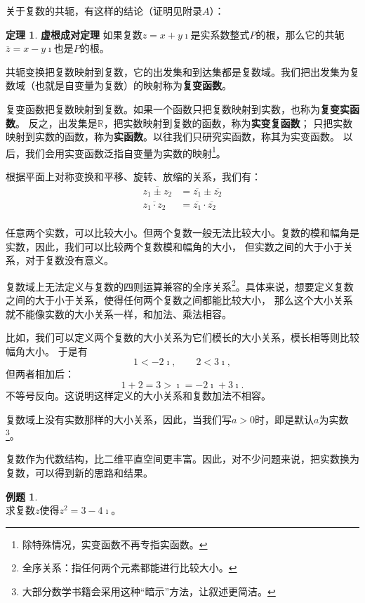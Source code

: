 \documentclass[12pt,UTF8]{ctexbook}
\theoremstyle{definition}
\newtheorem{tm}{定理}[section]
\newtheorem{et}{例题}[section]
\theoremstyle{plain}
\begin{document}
关于复数的共轭，有这样的结论（证明见附录$A$）：
\begin{tm}{\textbf{虚根成对定理}}
    如果复数$z=x+y\imath$是实系数整式$P$的根，那么它的共轭$\overline{z}=x-y\imath$也是$P$的根。
\end{tm}

共轭变换把复数映射到复数，它的出发集和到达集都是复数域。我们把出发集为复数域（也就是自变量为复数）的映射称为\textbf{复变函数}。

复变函数把复数映射到复数。如果一个函数只把复数映射到实数，也称为\textbf{复变实函数}。
反之，出发集是$\mathbb{R}$，把实数映射到复数的函数，称为\textbf{实变复函数}；
只把实数映射到实数的函数，称为\textbf{实函数}。以往我们只研究实函数，称其为实变函数。
以后，我们会用实变函数泛指自变量为实数的映射\footnote{除特殊情况，实变函数不再专指实函数。}。

根据平面上对称变换和平移、旋转、放缩的关系，我们有：
\begin{align*}
    \overline{z_1 \pm z_2} &= \overline{z_1} \pm \overline{z_2} \\
    \overline{z_1 \cdot z_2} &= \overline{z_1} \cdot \overline{z_2} \\
\end{align*}

任意两个实数，可以比较大小。但两个复数一般无法比较大小。复数的模和幅角是实数，因此，我们可以比较两个复数模和幅角的大小，
但实数之间的大于小于关系，对于复数没有意义。

复数域上无法定义与复数的四则运算兼容的全序关系\footnote{全序关系：指任何两个元素都能进行比较大小。}。具体来说，想要定义复数之间的大于小于关系，使得任何两个复数之间都能比较大小，
那么这个大小关系就不能像实数的大小关系一样，和加法、乘法相容。

比如，我们可以定义两个复数的大小关系为它们模长的大小关系，模长相等则比较幅角大小。
于是有
$$1 < -2\imath, \qquad 2 < 3\imath,$$
但两者相加后：
$$ 1 + 2 = 3 > \imath = -2\imath + 3\imath.$$
不等号反向。这说明这样定义的大小关系和复数加法不相容。

复数域上没有实数那样的大小关系，因此，当我们写$a > 0$时，即是默认$a$为实数\footnote{大部分数学书籍会采用这种“暗示”方法，让叙述更简洁。}。

复数作为代数结构，比二维平直空间更丰富。因此，对不少问题来说，把实数换为复数，可以得到新的思路和结果。

\begin{et}
    \mbox{} \\
    求复数$z$使得$z^2 = 3 - 4\imath$。
\end{et}
\end{document}
